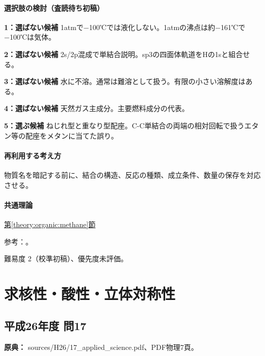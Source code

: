 \paragraph{選択肢の検討（査読待ち初稿）}\mbox{}\par

\noindent\textbf{1：選ばない候補} 1atmで−100℃では液化しない。1atmの沸点は約−161℃で−100℃は気体。\par

\noindent\textbf{2：選ばない候補} 2s/2p混成で単結合説明。sp3の四面体軌道をHの1sと組合せる。\par

\noindent\textbf{3：選ばない候補} 水に不溶。通常は難溶として扱う。有限の小さい溶解度はある。\par

\noindent\textbf{4：選ばない候補} 天然ガス主成分。主要燃料成分の代表。\par

\noindent\textbf{5：選ぶ候補} ねじれ型と重なり型配座。C-C単結合の両端の相対回転で扱うエタン等の配座をメタンに当てた誤り。\par

\paragraph{再利用する考え方} 物質名を暗記する前に、結合の構造、反応の種類、成立条件、数量の保存を対応させる。

\paragraph{共通理論} \hyperref[theory:organic:methane]{第\ref*{theory:organic:methane}節}

\par 参考：\cite{organic_methane,organic_isomers}。

\par 難易度 2（校準初稿）、優先度未評価。

\section{求核性・酸性・立体対称性}

\subsection{平成26年度 問17}
\label{q:h26-reg-applied-17}

\noindent\textbf{原典：} sources/H26/17\_applied\_science.pdf、PDF物理7頁。

